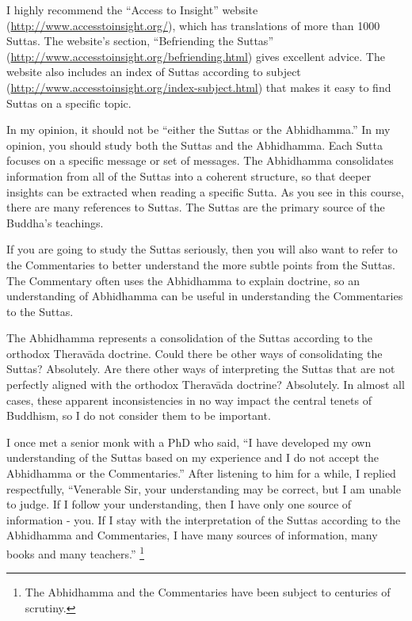 I highly recommend the “Access to Insight” website (\url{http://www.accesstoinsight.org/}), which has translations of more than 1000 Suttas. The website’s section, “Befriending the Suttas” (\url{http://www.accesstoinsight.org/befriending.html}) gives excellent advice. The website also includes an index of Suttas according to subject (\url{http://www.accesstoinsight.org/index-subject.html}) that makes it easy to find Suttas on a specific topic.


In my opinion, it should not be “either the Suttas or the Abhidhamma.” In my opinion, you should study both the Suttas and the Abhidhamma. Each Sutta focuses on a specific message or set of messages. The Abhidhamma consolidates information from all of the Suttas into a coherent structure, so that deeper insights can be extracted when reading a specific Sutta. As you see in this course, there are many references to Suttas. The Suttas are the primary source of the Buddha’s teachings.

\color{red}

If you are going to study the Suttas seriously, then you will also want to refer to the Commentaries to better understand the more subtle points from the Suttas. The Commentary often uses the Abhidhamma to explain doctrine, so an understanding of Abhidhamma can be useful in understanding the Commentaries to the Suttas.

\color{black}

\pagebreak


The Abhidhamma represents a consolidation of the Suttas according to the orthodox Theravāda doctrine. Could there be other ways of consolidating the Suttas? Absolutely. Are there other ways of interpreting the Suttas that are not perfectly aligned with the orthodox Theravāda doctrine? Absolutely. In almost all cases, these apparent inconsistencies in no way impact the central tenets of Buddhism, so I do not consider them to be important.

I once met a senior monk with a PhD who said, “I have developed my own understanding of the Suttas based on my experience and I do not accept the Abhidhamma or the Commentaries.” After listening to him for a while, I replied respectfully, “Venerable Sir, your understanding may be correct, but I am unable to judge. If I follow your understanding, then I have only one source of information - you. If I stay with the interpretation of the Suttas according to the Abhidhamma and Commentaries, I have many sources of information, many books and many teachers.” \footnote{The Abhidhamma and the Commentaries have been subject to centuries of scrutiny.}

